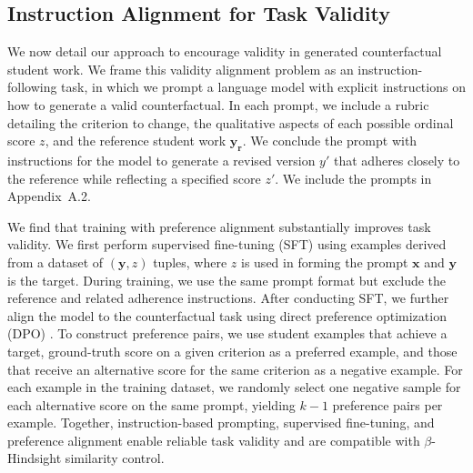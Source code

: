 \documentclass[letterpaper]{article} %
\begin{document}
\subsection{Instruction Alignment for Task Validity} \label{train-setup}

We now detail our approach to encourage validity in generated counterfactual student work. We frame this validity alignment problem as an instruction-following task, in which we prompt a language model with explicit instructions on how to generate a valid counterfactual. In each prompt, we include a rubric detailing the criterion to change, the qualitative aspects of each possible ordinal score $z$, and the reference student work $\mathbf{y_r}$. We conclude the prompt with instructions for the model to generate a revised version $y'$ that adheres closely to the reference while reflecting a specified score $z'$. We include the prompts in Appendix~A.2.

We find that training with preference alignment substantially improves task validity. We first perform supervised fine-tuning (SFT) \cite{ouyang2022training} using examples derived from a dataset of $(\mathbf{y}, z)$ tuples, where $z$ is used in forming the prompt $\textbf{x}$ and $\textbf{y}$ is the target. During training, we use the same prompt format but exclude the reference and related adherence instructions. After conducting SFT, we further align the model to the counterfactual task using direct preference optimization (DPO) \cite{rafailov2023direct}. To construct preference pairs, we use student examples that achieve a target, ground-truth score on a given criterion as a preferred example, and those that receive an alternative score for the same criterion as a negative example. For each example in the training dataset, we randomly select one negative sample for each alternative score on the same prompt, yielding $k-1$ preference pairs per example. Together, instruction-based prompting, supervised fine-tuning, and preference alignment enable reliable task validity and are compatible with $\beta$-Hindsight similarity control.


\end{document}
